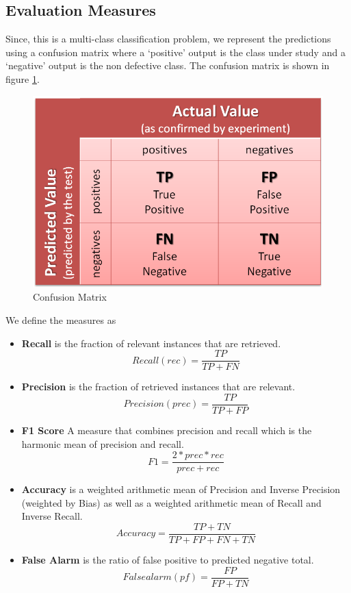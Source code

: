 \documentclass[conference]{IEEEtran}
\begin{document}
\subsection{\textbf{Evaluation Measures}}

Since, this is a multi-class classification problem, we represent the predictions using a confusion matrix where a `positive' output is the class under study and a `negative' output is the non defective class. The confusion matrix is shown in figure \ref{fig:cmatrix}.

\begin{figure}[!htpb]
    \centering
    \includegraphics[scale=0.35]{cmatrix.png}
    \caption{Confusion Matrix}

    \label{fig:cmatrix}
\end{figure}

We define the measures as
\begin{itemize}
\item \textbf{Recall}  is the fraction of relevant instances that are retrieved.
\[Recall(rec) = \dfrac{TP}{TP + FN}\]
\item \textbf{Precision} is the fraction of retrieved instances that are relevant.
\[Precision(prec) = \dfrac{TP}{TP + FP}\]
\item \textbf{F1 Score} A measure that combines precision and recall which is the harmonic mean of precision and recall.
\[F1 = \dfrac{2*prec*rec}{prec + rec}\]
\item \textbf{Accuracy} is a weighted arithmetic mean of Precision and Inverse Precision (weighted by Bias) as well as a weighted arithmetic mean of Recall and Inverse Recall.
\[Accuracy = \dfrac{TP + TN}{TP + FP + FN + TN}\]
\item \textbf{False Alarm} is the ratio of false positive to predicted negative total.
\[False alarm(pf) = \dfrac{FP}{FP + TN}\]
\end{itemize}
\end{document}
